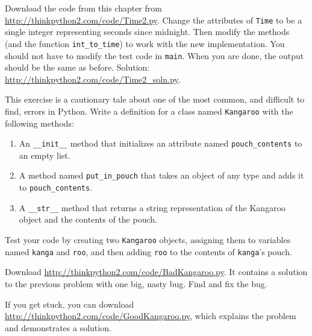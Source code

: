 \begin{exercise}

Download the code from this chapter from
\url{http://thinkpython2.com/code/Time2.py}.  Change the attributes of
    {\tt Time} to be a single integer representing seconds since
    midnight.  Then modify the methods (and the function
    \verb"int_to_time") to work with the new implementation.  You
    should not have to modify the test code in {\tt main}.  When you
    are done, the output should be the same as before.  Solution:
    \url{http://thinkpython2.com/code/Time2_soln.py}.

\end{exercise}


\begin{exercise}
\label{kangaroo}

This exercise is a cautionary tale about one of the most
common, and difficult to find, errors in Python.
Write a definition for a class named {\tt Kangaroo} with the following
methods:

\begin{enumerate}

\item An \verb"__init__" method that initializes an attribute named
\verb"pouch_contents" to an empty list.

\item A method named \verb"put_in_pouch" that takes an object
of any type and adds it to \verb"pouch_contents".

\item A \verb"__str__" method that returns a string representation
of the Kangaroo object and the contents of the pouch.

\end{enumerate}
%
Test your code
by creating two {\tt Kangaroo} objects, assigning them to variables
named {\tt kanga} and {\tt roo}, and then adding {\tt roo} to the
contents of {\tt kanga}'s pouch.

Download \url{http://thinkpython2.com/code/BadKangaroo.py}.  It contains
a solution to the previous problem with one big, nasty bug.
Find and fix the bug.

If you get stuck, you can download
\url{http://thinkpython2.com/code/GoodKangaroo.py}, which explains the
problem and demonstrates a solution.
    

\end{exercise}


